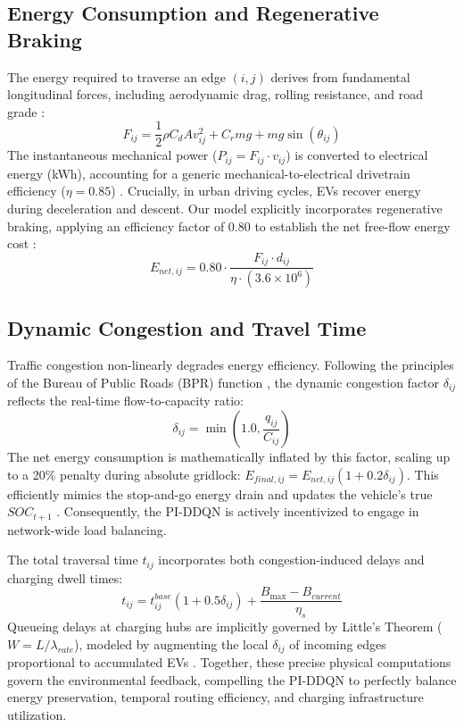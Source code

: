 \documentclass{article}
\begin{document}
\subsection{Energy Consumption and Regenerative Braking}
The energy required to traverse an edge $(i, j)$ derives from fundamental longitudinal forces, including aerodynamic drag, rolling resistance, and road grade \cite{gillespie1992fundamentals, fiori2016power}:
\begin{equation}
F_{ij} = \frac{1}{2}\rho C_d A v_{ij}^{2} + C_r m g + m g \sin(\theta_{ij})
\end{equation}
The instantaneous mechanical power ($P_{ij} = F_{ij} \cdot v_{ij}$) is converted to electrical energy (kWh), accounting for a generic mechanical-to-electrical drivetrain efficiency ($\eta = 0.85$) \cite{ehsani2018modern}. Crucially, in urban driving cycles, EVs recover energy during deceleration and descent. Our model explicitly incorporates regenerative braking, applying an efficiency factor of $0.80$ to establish the net free-flow energy cost \cite{settele2020peukert}:
\begin{equation}
E_{net, ij} = 0.80 \cdot \frac{F_{ij} \cdot d_{ij}}{\eta \cdot (3.6 \times 10^{6})}
\end{equation}

\subsection{Dynamic Congestion and Travel Time}
Traffic congestion non-linearly degrades energy efficiency. Following the principles of the Bureau of Public Roads (BPR) function \cite{bpr1964}, the dynamic congestion factor $\delta_{ij}$ reflects the real-time flow-to-capacity ratio:
\begin{equation}
\delta_{ij} = \min\left(1.0, \frac{q_{ij}}{C_{ij}}\right)
\end{equation}
The net energy consumption is mathematically inflated by this factor, scaling up to a 20\% penalty during absolute gridlock: $E_{final, ij} = E_{net, ij} (1 + 0.2 \delta_{ij})$. This efficiently mimics the stop-and-go energy drain and updates the vehicle's true $SOC_{t+1}$ \cite{das2025sggan}. Consequently, the PI-DDQN is actively incentivized to engage in network-wide load balancing.

The total traversal time $t_{ij}$ incorporates both congestion-induced delays and charging dwell times:
\begin{equation}
t_{ij} = t_{ij}^{base}\left(1 + 0.5 \delta_{ij}\right) + \frac{B_{\max} - B_{current}}{\eta_s}
\end{equation}
Queueing delays at charging hubs are implicitly governed by Little's Theorem ($W = L / \lambda_{rate}$), modeled by augmenting the local $\delta_{ij}$ of incoming edges proportional to accumulated EVs \cite{little1961}. Together, these precise physical computations govern the environmental feedback, compelling the PI-DDQN to perfectly balance energy preservation, temporal routing efficiency, and charging infrastructure utilization.
\end{document}
